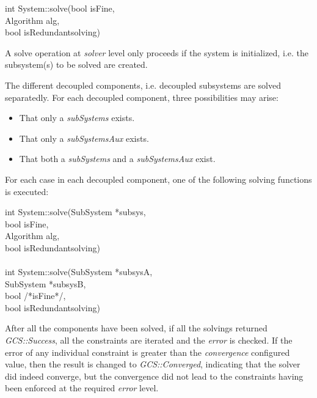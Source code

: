 \documentclass[12pt,twoside,a4paper]{book}
\begin{document}
    \begin{codequote}
    int System::solve(bool isFine,\\
    \-\hspace{3cm}Algorithm alg,\\
    \-\hspace{3cm}bool isRedundantsolving)
    \end{codequote}

    A solve operation at \emph{solver} level only proceeds if the system is initialized, i.e. the subsystem(s) to be solved are created.

    The different decoupled components, i.e. decoupled subsystems are solved separatedly. For each decoupled component, three possibilities may arise:

    \begin{itemize}
     \item That only a \emph{subSystems} exists.
     \item That only a \emph{subSystemsAux} exists.
     \item That both a \emph{subSystems} and a \emph{subSystemsAux} exist.
    \end{itemize}

    For each case in each decoupled component, one of the following solving functions is executed:

    \begin{codequote}
    int System::solve(SubSystem *subsys,\\
    \-\hspace{3cm}bool isFine,\\
    \-\hspace{3cm}Algorithm alg,\\
    \-\hspace{3cm}bool isRedundantsolving)\\
    \\
    int System::solve(SubSystem *subsysA,\\
    \-\hspace{3cm}SubSystem *subsysB, \\
    \-\hspace{3cm}bool /*isFine*/,\\
    \-\hspace{3cm}bool isRedundantsolving)
    \end{codequote}

    After all the components have been solved, if all the solvings returned \emph{GCS::Success}, all the constraints are iterated and the \emph{error} is checked. If the error of any individual constraint is greater than the \emph{convergence} configured value, then the result is changed to \emph{GCS::Converged}, indicating that the solver did indeed converge, but the convergence did not lead to the constraints having been enforced at the required \emph{error} level.
\end{document}
